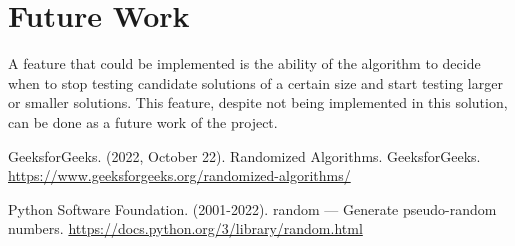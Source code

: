 \documentclass[...]{revdetua}
\begin{document}
\section{Future Work}

A feature that could be implemented is the ability of the algorithm to decide when  to  stop  testing  candidate solutions  of  a  certain  size  and  start  testing larger or smaller solutions. This feature, despite not being implemented in this solution, can be done as a future work of the project.

\begin{thebibliography}{9}

GeeksforGeeks. (2022, October 22). Randomized Algorithms. GeeksforGeeks. \url{https://www.geeksforgeeks.org/randomized-algorithms/}

Python Software Foundation. (2001-2022). random — Generate pseudo-random numbers. 
\url{https://docs.python.org/3/library/random.html}

\end{thebibliography}


\end{document}

